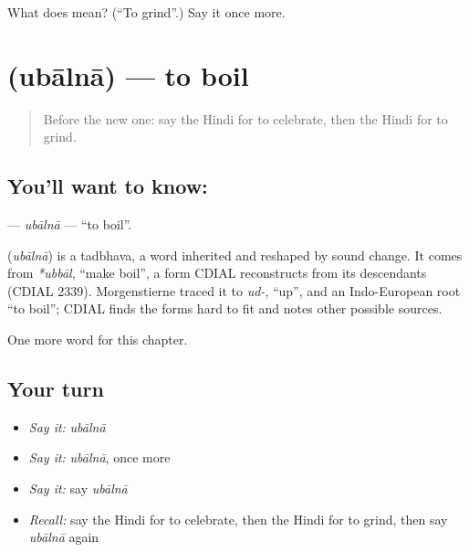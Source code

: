 \begin{tcolorbox}[breakable,colback=teal!4,colframe=teal!35!black,title={Before you move on}]
What does  mean? (\textquotedblleft{}To grind\textquotedblright{}.) Say it once more.
\end{tcolorbox}
\section[\texorpdfstring{\hi{उबालना} (ubālnā)}{उबालना (ubālnā)}]{ (ubālnā) — to boil}

\label{lesson:HI-C177-ubalna}



\begin{quote}
Before the new one: say the Hindi for to celebrate, then the Hindi for to grind.
\end{quote}

\subsection*{You'll want to know: }
\textbf{} — \emph{ubālnā} — \textquotedblleft{}to boil\textquotedblright{}.

\begin{cousinweb}
\textbf{} (\emph{ubālnā}) is a tadbhava, a word inherited and reshaped by sound change. It comes from \emph{*ubbāl}, \textquotedblleft{}make boil\textquotedblright{}, a form CDIAL reconstructs from its descendants (CDIAL 2339). Morgenstierne traced it to \emph{ud-}, \textquotedblleft{}up\textquotedblright{}, and an Indo-European root \textquotedblleft{}to boil\textquotedblright{}; CDIAL finds the forms hard to fit and notes other possible sources.
\end{cousinweb}

\begin{grammarlens}[title={What you've built}]
One more word for this chapter.
\end{grammarlens}

\subsection*{Your turn}
\begin{itemize}
\raggedright
  \item \emph{Say it:} \emph{ubālnā}
  \item \emph{Say it:} \emph{ubālnā}, once more
  \item \emph{Say it:} say \emph{ubālnā}
  \item \emph{Recall:} say the Hindi for to celebrate, then the Hindi for to grind, then say \emph{ubālnā} again
\end{itemize}

